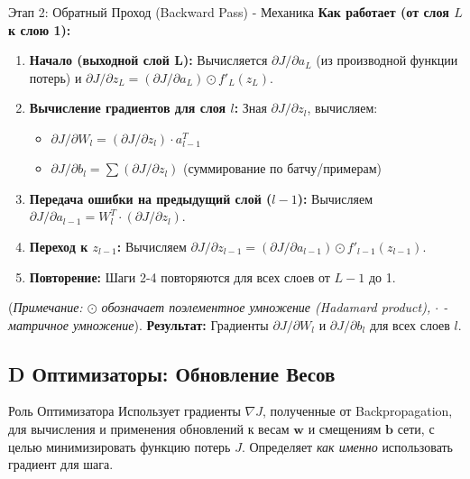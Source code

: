 \begin{myexampleblock}{Этап 2: Обратный Проход (Backward Pass) - Механика}
    \textbf{Как работает (от слоя $L$ к слою 1):}
    \begin{enumerate}[nosep, itemsep=0.5ex]
        \item \textbf{Начало (выходной слой L):} Вычисляется $\partial J / \partial a_L$ (из производной функции потерь) и $\partial J / \partial z_L = (\partial J / \partial a_L) \odot f'_L(z_L)$.
        \item \textbf{Вычисление градиентов для слоя $l$:} Зная $\partial J / \partial z_l$, вычисляем:
            \begin{itemize}[label=\textbullet, nosep, leftmargin=*]
                \item $\partial J / \partial W_l = (\partial J / \partial z_l) \cdot a_{l-1}^T$
                \item $\partial J / \partial b_l = \sum (\partial J / \partial z_l)$ (суммирование по батчу/примерам)
            \end{itemize}
        \item \textbf{Передача ошибки на предыдущий слой ($l-1$):} Вычисляем $\partial J / \partial a_{l-1} = W_l^T \cdot (\partial J / \partial z_l)$.
        \item \textbf{Переход к $z_{l-1}$:} Вычисляем $\partial J / \partial z_{l-1} = (\partial J / \partial a_{l-1}) \odot f'_{l-1}(z_{l-1})$.
        \item \textbf{Повторение:} Шаги 2-4 повторяются для всех слоев от $L-1$ до 1.
    \end{enumerate}
     (\textit{Примечание: $\odot$ обозначает поэлементное умножение (Hadamard product), $\cdot$ - матричное умножение}).
     \textbf{Результат:} Градиенты $\partial J / \partial W_l$ и $\partial J / \partial b_l$ для всех слоев $l$.
\end{myexampleblock}

\subsection{D Оптимизаторы: Обновление Весов}

\begin{alerttextbox}{Роль Оптимизатора}
    Использует градиенты $\nabla J$, полученные от Backpropagation, для вычисления и применения обновлений к весам $\mathbf{w}$ и смещениям $\mathbf{b}$ сети, с целью минимизировать функцию потерь $J$. Определяет \textit{как именно} использовать градиент для шага.
\end{alerttextbox}

